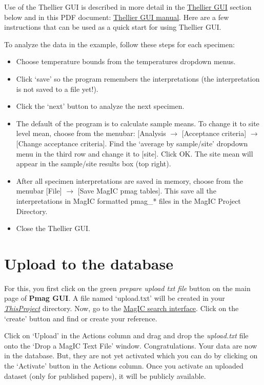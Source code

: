 \documentclass[11pt]{book}
\begin{document}
{Use of the Thellier GUI is described in more detail in the \href{#thellier_GUI.py}{Thellier GUI} section below and in this PDF document: \href{https://github.com/PmagPy/PmagPy-Cookbook/raw/gh-pages/thellier_GUI_full_manual.pdf}{Thellier GUI manual}. Here are a few instructions that can be used as a quick start for using Thellier GUI.

To analyze the data in the example, follow these steps for each specimen:
 \begin{itemize}
\item Choose temperature bounds from the temperatures dropdown menus.
\item  Click `save' so the program remembers the interpretations (the interpretation is not saved to a file yet!).
\item  Click the `next' button to analyze the next specimen.
\item The default of the program is to calculate sample means. To change it to site level mean, choose from the menubar: [Analysis $\rightarrow$ [Acceptance criteria] $\rightarrow$  [Change acceptance criteria]. Find the `average by sample/site' dropdown menu in the third row and change it to [site]. Click OK. The site mean will appear in the sample/site results box (top right).
\item  After all specimen interpretations are saved in memory, choose from the menubar [File] $\rightarrow$ [Save MagIC pmag tables]. This save all the interpretations in MagIC formatted pmag\_* files in the MagIC Project Directory.
\item  Close the Thellier GUI.
\end{itemize}


\section{Upload to the database }

For this, you first click on the green {\it prepare upload txt file} button on the main page of {\bf Pmag GUI}. A file named `upload.txt' will be created in your \href{#Project_Directory}{\it ThisProject} directory.  Now, go to the  \href{http://earthref.org/MAGIC/search}{MagIC search interface}.      Click on the `create' button and find or create your reference.

Click on `Upload' in the Actions column and   drag and drop the {\it upload.txt}   file onto the  `Drop a MagIC Text File' window.
Congratulations. Your data are now in the database.  But, they are not yet activated which you can do by clicking on the `Activate' button in the Actions column.  Once you activate an uploaded dataset (only for published papers), it will be publicly available.

}
\end{document}

